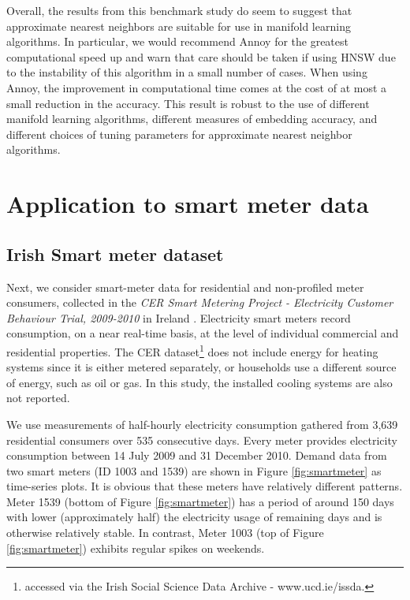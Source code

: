 \documentclass[11pt,a4paper,]{article}
\begin{document}
Overall, the results from this benchmark study do seem to suggest that approximate nearest neighbors are suitable for use in manifold learning algorithms. In particular, we would recommend Annoy for the greatest computational speed up and warn that care should be taken if using HNSW due to the instability of this algorithm in a small number of cases. When using Annoy, the improvement in computational time comes at the cost of at most a small reduction in the accuracy. This result is robust to the use of different manifold learning algorithms, different measures of embedding accuracy, and different choices of tuning parameters for approximate nearest neighbor algorithms.

\hypertarget{smartmeter}{%
\section{Application to smart meter data}\label{smartmeter}}

\hypertarget{irish-smart-meter-dataset}{%
\subsection{Irish Smart meter dataset}\label{irish-smart-meter-dataset}}

Next, we consider smart-meter data for residential and non-profiled meter consumers, collected in the \emph{CER Smart Metering Project - Electricity Customer Behaviour Trial, 2009-2010} in Ireland \autocite{cer2012-data}. Electricity smart meters record consumption, on a near real-time basis, at the level of individual commercial and residential properties. The CER dataset\footnote{accessed via the Irish Social Science Data Archive - www.ucd.ie/issda.} does not include energy for heating systems since it is either metered separately, or households use a different source of energy, such as oil or gas. In this study, the installed cooling systems are also not reported.

We use measurements of half-hourly electricity consumption gathered from 3,639 residential consumers over 535 consecutive days. Every meter provides electricity consumption between 14 July 2009 and 31 December 2010. Demand data from two smart meters (ID 1003 and 1539) are shown in Figure \ref{fig:smartmeter} as time-series plots. It is obvious that these meters have relatively different patterns. Meter 1539 (bottom of Figure \ref{fig:smartmeter}) has a period of around 150 days with lower (approximately half) the electricity usage of remaining days and is otherwise relatively stable. In contrast, Meter 1003 (top of Figure \ref{fig:smartmeter}) exhibits regular spikes on weekends.
\end{document}
